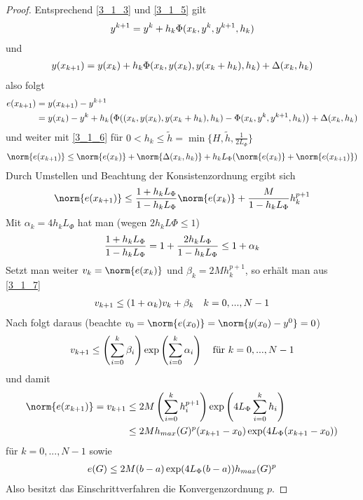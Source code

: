 \begin{proof}
	Entsprechend \cref{3_1_3} und \cref{3_1_5} gilt
	\begin{align}
		y^{k+1} = y^k + h_k\Phi(x_k,y^k,y^{k+1},h_k) \notag
	\end{align}
	und
	\begin{align}
		y(x_{k+1}) = y(x_k) + h_k\Phi(x_k,y(x_k),y(x_k+h_k),h_k) + \Delta(x_k,h_k) \notag
	\end{align}
	also folgt
	\begin{align}
		e(x_{k+1}) &= y(x_{k+1}) - y^{k+1} \notag \\
		&= y(x_k) - y^k + h_k\big(\Phi((x_k,y(x_k),y(x_k+h_k),h_k) - \Phi(x_k,y^k,y^{k+1},h_k)\big) + \Delta(x_k,h_k) \notag
	\end{align}
	und weiter mit \cref{3_1_6} für $0<h_k\le \tilde{h}=\min\{H,\tilde{h},\frac{1}{2L_\Phi}\}$
	\begin{align}
		\norm{e(x_{k+1})} \le \norm{e(x_k)} + \norm{\Delta(x_k,h_k)} + h_kL_\Phi(\norm{e(x_k)} + \norm{e(x_{k+1})}) \notag
	\end{align}
	Durch Umstellen und Beachtung der Konsistenzordnung ergibt sich
	\begin{align}
		\label{3_1_7}
		\norm{e(x_{k+1})} \le \frac{1+h_kL_\Phi}{1-h_kL_\Phi}\norm{e(x_k)} + \frac{M}{1-h_kL_\Phi}h_k^{p+1}
	\end{align}
	Mit $\alpha_k=4h_kL_\Phi$ hat man (wegen $2h_kL\Phi\le 1$)
	\begin{align}
		\frac{1+h_kL_\Phi}{1-h_kL_\Phi} = 1 + \frac{2h_kL_\Phi}{1-h_kL_\Phi} \le 1+\alpha_k \notag
	\end{align}
	Setzt man weiter $v_k=\norm{e(x_k)}$ und $\beta_k=2Mh_k^{p+1}$, so erhält man aus \cref{3_1_7}
	\begin{align}
		v_{k+1} \le (1+\alpha_k)v_k + \beta_k\quad k=0,...,N-1\notag
	\end{align}
	Nach  folgt daraus (beachte $v_0=\norm{e(x_0)} = \norm{y(x_0) - y^0} = 0$)
	\begin{align}
		v_{k+1} \le \left(\sum_{i=0}^k \beta_i\right)\exp\left(\sum_{i=0}^k \alpha_i\right) \quad\text{für } k=0,...,N-1\notag
	\end{align}
	und damit
	\begin{align}
		\norm{e(x_{k+1})} = v_{k+1} &\le 2M\left(\sum_{i=0}^k h_i^{p+1}\right)\exp\left(4L_\Phi\sum_{i=0}^k h_i\right) \notag \\
		&\le 2Mh_{max}(G)^p(x_{k+1}-x_0)\exp(4L_\Phi(x_{k+1} - x_0)) \notag
	\end{align}
	für $k=0,...,N-1$ sowie
	\begin{align}
		e(G) \le 2M(b-a)\exp(4L_\Phi(b-a))h_{max}(G)^p \notag
	\end{align}
	Also besitzt das Einschrittverfahren die Konvergenzordnung $p$.
\end{proof}

